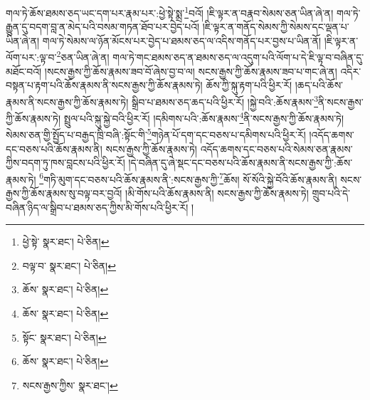 གལ་ཏེ་ཆོས་ཐམས་ཅད་ཡང་དག་པར་རྣམ་པར་:ཕྱེ་སྟེ་སྨྲ་\footnote{ཕྱེ་སྟེ་  སྣར་ཐང་།  པེ་ཅིན། }བའོ། །ཇི་ལྟར་ན་བརྣབ་སེམས་ཅན་ཡིན་ཞེ་ན། གལ་ཏེ་རྒྱུན་དུ་བདག་བླ་ན་མེད་པའི་བསམ་གཏན་ཐོབ་པར་བྱེད་པའོ། །ཇི་ལྟར་ན་གནོད་སེམས་ཀྱི་སེམས་དང་ལྡན་པ་ཡིན་ཞེ་ན། གལ་ཏེ་སེམས་ལ་ཉོན་མོངས་པར་བྱེད་པ་ཐམས་ཅད་ལ་འདིས་གནོད་པར་བྱས་པ་ཡིན་ནོ། །ཇི་ལྟར་ན་ལོག་པར་:ལྟ་བ་\footnote{བལྟ་བ་  སྣར་ཐང་།  པེ་ཅིན། }ཅན་ཡིན་ཞེ་ན། གལ་ཏེ་གང་ཐམས་ཅད་ན་ཐམས་ཅད་ལ་འདུག་པའི་ལོག་པ་དེ་ཇི་ལྟ་བ་བཞིན་དུ་མཐོང་བའོ། །སངས་རྒྱས་ཀྱི་ཆོས་རྣམས་ཟབ་བོ་ཞེས་བྱ་བ་ལ། སངས་རྒྱས་ཀྱི་ཆོས་རྣམས་ཟབ་པ་གང་ཞེ་ན། འདིར་བསྟན་པ་རྟག་པའི་ཆོས་རྣམས་ནི་སངས་རྒྱས་ཀྱི་ཆོས་རྣམས་ཏེ། ཆོས་ཀྱི་སྐུ་རྟག་པའི་ཕྱིར་རོ། །ཆད་པའི་ཆོས་རྣམས་ནི་སངས་རྒྱས་ཀྱི་ཆོས་རྣམས་ཏེ། སྒྲིབ་པ་ཐམས་ཅད་ཆད་པའི་ཕྱིར་རོ། །སྐྱེ་བའི་:ཆོས་རྣམས་\footnote{ཆོས་  སྣར་ཐང་།  པེ་ཅིན། }ནི་སངས་རྒྱས་ཀྱི་ཆོས་རྣམས་ཏེ། སྤྲུལ་པའི་སྐུ་སྐྱེ་བའི་ཕྱིར་རོ། །དམིགས་པའི་:ཆོས་རྣམས་\footnote{ཆོས་  སྣར་ཐང་།  པེ་ཅིན། }ནི་སངས་རྒྱས་ཀྱི་ཆོས་རྣམས་ཏེ། སེམས་ཅན་གྱི་སྤྱོད་པ་བརྒྱད་ཁྲི་བཞི་:སྟོང་གི་\footnote{སྟོང་  སྣར་ཐང་།  པེ་ཅིན། }གཉེན་པོ་དག་དང་བཅས་པ་དམིགས་པའི་ཕྱིར་རོ། །འདོད་ཆགས་དང་བཅས་པའི་ཆོས་རྣམས་ནི། སངས་རྒྱས་ཀྱི་ཆོས་རྣམས་ཏེ། འདོད་ཆགས་དང་བཅས་པའི་སེམས་ཅན་རྣམས་ཀྱིས་བདག་ཏུ་ཁས་བླངས་པའི་ཕྱིར་རོ། །དེ་བཞིན་དུ་ཞེ་སྡང་དང་བཅས་པའི་ཆོས་རྣམས་ནི་སངས་རྒྱས་ཀྱི་:ཆོས་རྣམས་ཏེ། \footnote{ཆོས་  སྣར་ཐང་།  པེ་ཅིན། }གཏི་མུག་དང་བཅས་པའི་ཆོས་རྣམས་ནི་:སངས་རྒྱས་ཀྱི་\footnote{སངས་རྒྱས་ཀྱིས་  སྣར་ཐང་། }ཆོས། སོ་སོའི་སྐྱེ་བོའི་ཆོས་རྣམས་ནི། སངས་རྒྱས་ཀྱི་ཆོས་རྣམས་སུ་བལྟ་བར་བྱའོ། །མི་གོས་པའི་ཆོས་རྣམས་ནི། སངས་རྒྱས་ཀྱི་ཆོས་རྣམས་ཏེ། གྲུབ་པའི་དེ་བཞིན་ཉིད་ལ་སྒྲིབ་པ་ཐམས་ཅད་ཀྱིས་མི་གོས་པའི་ཕྱིར་རོ། །
